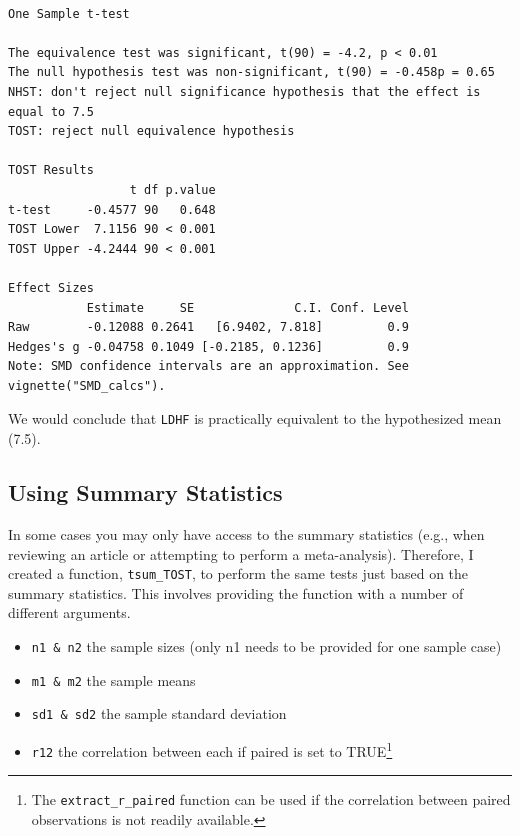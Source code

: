 \documentclass[
]{interact}
\providecommand{\tightlist}{%
  \setlength{\itemsep}{0pt}\setlength{\parskip}{0pt}}\usepackage{longtable,booktabs,array}
\begin{document}
\begin{verbatim}

One Sample t-test

The equivalence test was significant, t(90) = -4.2, p < 0.01
The null hypothesis test was non-significant, t(90) = -0.458p = 0.65
NHST: don't reject null significance hypothesis that the effect is equal to 7.5 
TOST: reject null equivalence hypothesis

TOST Results 
                 t df p.value
t-test     -0.4577 90   0.648
TOST Lower  7.1156 90 < 0.001
TOST Upper -4.2444 90 < 0.001

Effect Sizes 
           Estimate     SE              C.I. Conf. Level
Raw        -0.12088 0.2641   [6.9402, 7.818]         0.9
Hedges's g -0.04758 0.1049 [-0.2185, 0.1236]         0.9
Note: SMD confidence intervals are an approximation. See vignette("SMD_calcs").
\end{verbatim}

We would conclude that \texttt{LDHF} is practically equivalent to the
hypothesized mean (7.5).

\newpage

\hypertarget{using-summary-statistics}{%
\subsection{Using Summary Statistics}\label{using-summary-statistics}}

In some cases you may only have access to the summary statistics (e.g.,
when reviewing an article or attempting to perform a meta-analysis).
Therefore, I created a function, \texttt{tsum\_TOST}, to perform the
same tests just based on the summary statistics. This involves providing
the function with a number of different arguments.

\begin{itemize}
\tightlist
\item
  \texttt{n1\ \&\ n2} the sample sizes (only n1 needs to be provided for
  one sample case)
\item
  \texttt{m1\ \&\ m2} the sample means
\item
  \texttt{sd1\ \&\ sd2} the sample standard deviation
\item
  \texttt{r12} the correlation between each if paired is set to
  TRUE\footnote{The \texttt{extract\_r\_paired} function can be used if
    the correlation between paired observations is not readily
    available.}
\end{itemize}
\end{document}
